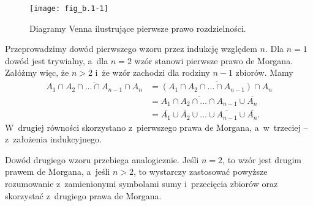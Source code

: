 
\exercise %
\begin{figure}[ht]
	\begin{center}
		\texttt{[image: fig\_b.1-1]}
	\end{center}
	\caption{Diagramy Venna ilustrujące pierwsze prawo rozdzielności.}
\end{figure}

\exercise %
Przeprowadzimy dowód pierwszego wzoru przez indukcję względem $n$.
Dla $n=1$ dowód jest trywialny, a~dla $n=2$ wzór stanowi pierwsze prawo de Morgana.
Załóżmy więc, że $n>2$ i~że wzór zachodzi dla rodziny $n-1$ zbiorów.
Mamy
\begin{align*}
	\overline{A_1\cap A_2\cap\dots\cap A_{n-1}\cap A_n} &= \overline{(A_1\cap A_2\cap\dots\cap A_{n-1})\cap A_n} \\
	&= \overline{A_1\cap A_2\cap\dots\cap A_{n-1}}\cup\overline{A_n} \\
	&= \overline{A_1}\cup\overline{A_2}\cup\dots\cup\overline{A_{n-1}}\cup\overline{A_n}.
\end{align*}
W~drugiej równości skorzystano z~pierwszego prawa de Morgana, a~w~trzeciej -- z~założenia indukcyjnego.

Dowód drugiego wzoru przebiega analogicznie.
Jeśli $n=2$, to wzór jest drugim prawem de Morgana, a~jeśli $n>2$, to wystarczy zastosować powyższe rozumowanie z~zamienionymi symbolami sumy i~przecięcia zbiorów oraz skorzystać z~drugiego prawa de Morgana.


